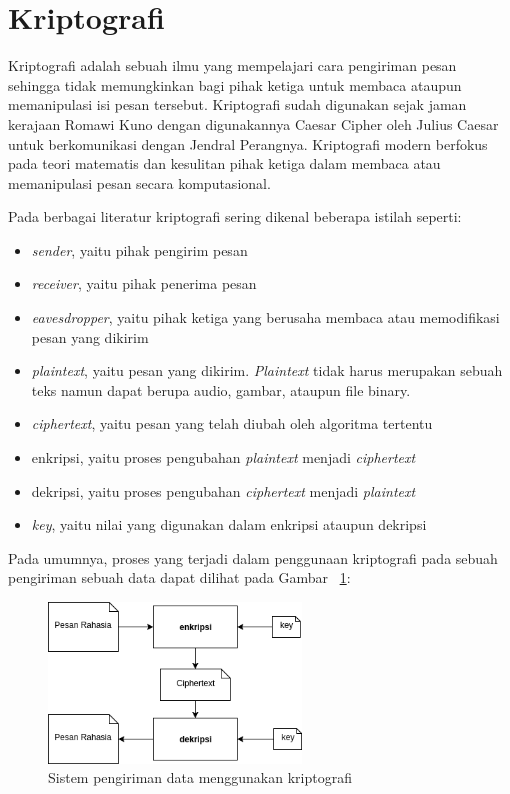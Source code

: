 \section{Kriptografi}
  Kriptografi adalah sebuah ilmu yang mempelajari cara pengiriman pesan sehingga tidak memungkinkan bagi pihak ketiga untuk membaca ataupun memanipulasi isi pesan tersebut. Kriptografi sudah digunakan sejak jaman kerajaan Romawi Kuno dengan digunakannya Caesar Cipher oleh Julius Caesar untuk berkomunikasi dengan Jendral Perangnya. Kriptografi modern berfokus pada teori matematis dan kesulitan pihak ketiga dalam membaca atau memanipulasi pesan secara komputasional.

  Pada berbagai literatur kriptografi sering dikenal beberapa istilah seperti:
  \begin{itemize}
    \item \textit{sender}, yaitu pihak pengirim pesan
    \item \textit{receiver}, yaitu pihak penerima pesan
    \item \textit{eavesdropper}, yaitu pihak ketiga yang berusaha membaca atau memodifikasi pesan yang dikirim
    \item \textit{plaintext}, yaitu pesan yang dikirim. \textit{Plaintext} tidak harus merupakan sebuah teks namun dapat berupa audio, gambar, ataupun file binary.
    \item \textit{ciphertext}, yaitu pesan yang telah diubah oleh algoritma tertentu
    \item enkripsi, yaitu proses pengubahan \textit{plaintext} menjadi \textit{ciphertext}
    \item dekripsi, yaitu proses pengubahan \textit{ciphertext} menjadi \textit{plaintext}
    \item \textit{key}, yaitu nilai yang digunakan dalam enkripsi ataupun dekripsi
  \end{itemize}

  Pada umumnya, proses yang terjadi dalam penggunaan kriptografi pada sebuah pengiriman sebuah data dapat dilihat pada Gambar ~\ref{fig:krypto_system}:

  \begin{figure}[h]
    \centering
    \includegraphics[width=0.6\textwidth]{resources/ch-2/crypto-system.jpg}
    \caption{Sistem pengiriman data menggunakan kriptografi}
    \label{fig:krypto_system}
  \end{figure}

